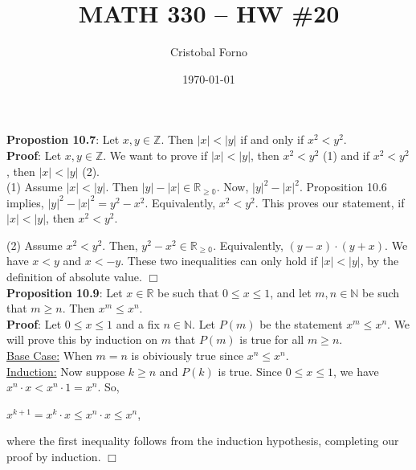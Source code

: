 \documentclass[12pt]{article}
\title{MATH 330 -- HW \#20}
\author{Cristobal Forno}
\date{\today}
\begin{document}
\maketitle

\noindent
\textbf{Propostion 10.7}: Let $x, y \in \mathbb{Z}$. Then $|x| < |y|$ if and
only if $x^2 < y^2$.\\

\noindent
\textbf{Proof}:
Let $x, y \in \mathbb{Z}$. We want to prove if $|x| < |y|$, then $x^2 < y^2$ (1)
and if $x^2 < y^2$, then $|x| < |y|$ (2).\\
\indent
(1) Assume $|x| < |y|$. Then $|y| - |x| \in \mathbb{R_{\geq0}}$. Now, $|y|^2 -
|x|^2$. Proposition 10.6 implies, $|y|^2 - |x|^2 = y^2 - x^2$. Equivalently,
$x^2 < y^2$. This proves our statement, if $|x| < |y|$, then $x^2 < y^2$.

\indent
(2) Assume $x^2 < y^2$. Then, $y^2 - x^2 \in \mathbb{R_{\geq0}}$. Equivalently,
$(y-x) \cdot (y+x)$. We have $x < y$ and $x < -y$. These two inequalities can
only hold if $|x| < |y|$, by the definition of absolute value. $\Box$ \\

\noindent
\textbf{Proposition 10.9}: Let $x \in \mathbb{R}$ be such that $0 \leq x \leq
1$, and let $m,n \in \mathbb{N}$ be such that $m \geq n$. Then $x^m \leq x^n$.\\

\noindent
\textbf{Proof}:
Let $0 \leq x \leq 1$ and a fix $n \in \mathbb{N}$. Let $P(m)$ be the statement
$x^m \leq x^n$. We will prove this by induction on $m$ that $P(m)$ is true for
all $m \geq n$. \\
\indent
\underline{Base Case:} When $m = n$ is obiviously true since $x^n \leq x^n$.\\
\indent
\underline{Induction:} Now suppose $k \geq n$ and $P(k)$ is true. Since $0 \leq
x \leq 1$, we have $x^n \cdot x < x^n \cdot 1 = x^n$. So,
\begin{center}
  $x^{k+1} = x^k \cdot x \leq x^n \cdot x \leq x^n$,
\end{center}
where the first inequality follows from the induction hypothesis, completing our
proof by induction. $\Box$
\end{document}

